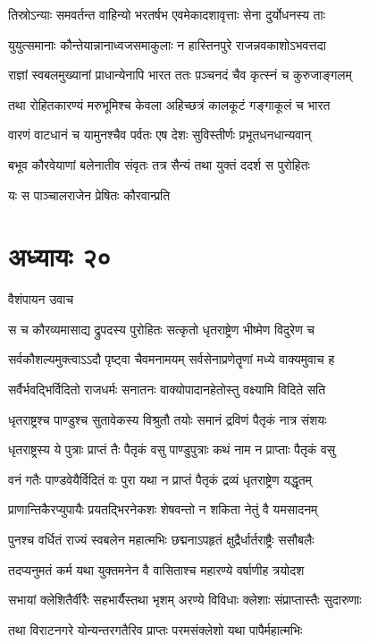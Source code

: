 \twolineshloka
{तिस्रोऽन्याः समवर्तन्त वाहिन्यो भरतर्षभ}
{एवमेकादशावृत्ताः सेना दुर्योधनस्य ताः}


\twolineshloka
{युयुत्समानाः कौन्तेयान्नानाध्वजसमाकुलाः}
{न हास्तिनपुरे राजन्नवकाशोऽभवत्तदा}


\twolineshloka
{राज्ञां स्वबलमुख्यानां प्राधान्येनापि भारत}
{ततः प़ञ्चनदं चैव कृत्स्नं च कुरुजाङ्गलम्}


\twolineshloka
{तथा रोहितकारण्यं मरुभूमिश्च केवला}
{अहिच्छत्रं कालकूटं गङ्गाकूलं च भारत}


\twolineshloka
{वारणं वाटधानं च यामुनश्चैव पर्वतः}
{एष देशः सुविस्तीर्णः प्रभूतधनधान्यवान्}


\twolineshloka
{बभूव कौरवेयाणां बलेनातीव संवृतः}
{तत्र सैन्यं तथा युक्तं ददर्श स पुरोहितः}


यः स पाञ्चालराजेन प्रेषितः कौरवान्प्रति
\chapter{अध्यायः २०}
\twolineshloka
{वैशंपायन उवाच}
{}


\twolineshloka
{स च कौरव्यमासाद्य द्रुपदस्य पुरोहितः}
{सत्कृतो धृतराष्ट्रेण भीष्मेण विदुरेण च}


\twolineshloka
{सर्वकौशल्यमुक्त्वाऽऽदौ पृष्ट्वा चैवमनामयम्}
{सर्वसेनाप्रणेतॄणां मध्ये वाक्यमुवाच ह}


\twolineshloka
{सर्वैर्भवद्भिर्विदितो राजधर्मः सनातनः}
{वाक्योपादानहेतोस्तु वक्ष्यामि विदिते सति}


\twolineshloka
{धृतराष्ट्रश्च पाण्डुश्च सुतावेकस्य विश्रुतौ}
{तयोः समानं द्रविणं पैतृकं नात्र संशयः}


\twolineshloka
{धृतराष्ट्रस्य ये पुत्राः प्राप्तं तैः पैतृकं वसु}
{पाण्डुपुत्राः कथं नाम न प्राप्ताः पैतृकं वसु}


\twolineshloka
{वनं गतैः पाण्डवेयैर्विदितं वः पुरा यथा}
{न प्राप्तं पैतृकं द्रव्यं धृतराष्ट्रेण यद्धृतम्}


\twolineshloka
{प्राणान्तिकैरप्युपायैः प्रयतद्भिरनेकशः}
{शेषवन्तो न शकिता नेतुं वै यमसादनम्}


\twolineshloka
{पुनश्च वर्धितं राज्यं स्वबलेन महात्मभिः}
{छद्मनाऽपहृतं क्षुद्रैर्धार्तराष्ट्रैः ससौबलैः}


\twolineshloka
{तदप्यनुमतं कर्म यथा युक्तमनेन वै}
{वासिताश्च महारण्ये वर्षाणीह त्रयोदश}


\twolineshloka
{सभायां क्लेशितैर्वीरैः सहभार्यैस्तथा भृशम्}
{अरण्ये विविधाः क्लेशाः संप्राप्तास्तैः सुदारुणाः}


\twolineshloka
{तथा विराटनगरे योन्यन्तरगतैरिव}
{प्राप्तः परमसंक्लेशो यथा पापैर्महात्मभिः}


